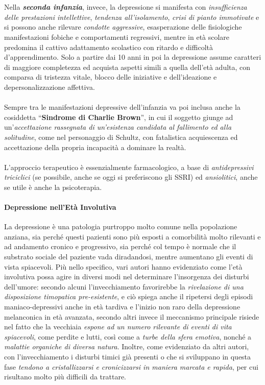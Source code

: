 \\\\
Nella \textbf{\emph{seconda infanzia}}, invece, la depressione si
manifesta con \emph{insufficienza delle prestazioni intellettive},
\emph{tendenza all'isolamento}, \emph{crisi di pianto immotivate} e si
possono anche rilevare \emph{condotte aggressive}, esasperazione delle
fisiologiche manifestazioni fobiche e comportamenti regressivi, mentre
in età scolare predomina il cattivo adattamento scolastico con ritardo e
difficoltà d'apprendimento. Solo a partire dai 10 anni in poi la
depressione assume caratteri di maggiore completezza ed acquista aspetti
simili a quella dell'età adulta, con comparsa di tristezza vitale,
blocco delle iniziative e dell'ideazione e depersonalizzazione
affettiva.
\\\\
Sempre tra le manifestazioni depressive dell'infanzia va poi inclusa
anche la cosiddetta ``\textbf{Sindrome di Charlie Brown}'', in cui il
soggetto giunge ad un'\emph{accettazione rassegnata di un'esistenza
candidata al fallimento ed alla solitudine}, come nel personaggio di
Schultz, con fatalistica acquiescenza ed accettazione della propria
incapacità a dominare la realtà.
\\\\
L'approccio terapeutico è essenzialmente farmacologico, a base di
\emph{antidepressivi triciclici} (se possibile, anche se oggi si
preferiscono gli SSRI) ed \emph{ansiolitici}, anche se utile è anche la
psicoterapia.

\paragraph{Depressione nell'Età Involutiva}

La depressione è una patologia purtroppo molto comune nella popolazione
anziana, sia perché questi pazienti sono più esposti a comorbilità molto
rilevanti e ad andamento cronico e progressivo, sia perché col tempo è
normale che il substrato sociale del paziente vada diradandosi, mentre
aumentano gli eventi di vista spiacevoli. Più nello specifico, vari
autori hanno evidenziato come l'età involutiva possa agire in diversi
modi nel determinare l'insorgenza dei disturbi dell'umore: secondo
alcuni l'invecchiamento favorirebbe la \emph{rivelazione di una
disposizione timopatica pre-esistente}, e ciò spiega anche il ripetersi
degli episodi maniaco-depressivi anche in età tardiva e l'inizio non
raro della depressione melanconica in età avanzata, secondo altri invece
il meccanismo principale risiede nel fatto che la vecchiaia \emph{espone
ad un numero rilevante di eventi di vita spiacevoli}, come perdite e
lutti, così come a \emph{turbe della sfera emotiva}, nonché a
\emph{malattie organiche di diversa natura}. Inoltre, come evidenziato
da altri autori, con l'invecchiamento i disturbi timici già presenti o
che si sviluppano in questa fase \emph{tendono a cristallizzarsi e
cronicizzarsi in maniera marcata e rapida}, per cui risultano molto più
difficili da trattare.

